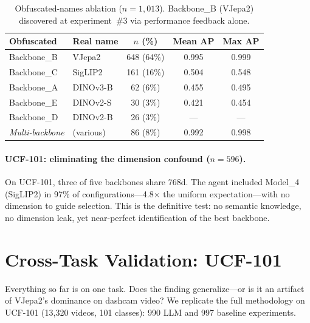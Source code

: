 \documentclass{article}
\begin{document}
\begin{table}[t]
\centering
\caption{Obfuscated-names ablation ($n = 1{,}013$). Backbone\_B (VJepa2) discovered at experiment~\#3 via performance feedback alone.}
\label{tab:obfuscated}
\small
\begin{tabular}{@{}llccc@{}}
\toprule
Obfuscated & Real name & $n$ (\%) & Mean AP & Max AP \\
\midrule
Backbone\_B & VJepa2 & 648 (64\%) & 0.995 & 0.999 \\
Backbone\_C & SigLIP2 & 161 (16\%) & 0.504 & 0.548 \\
Backbone\_A & DINOv3-B & 62 (6\%) & 0.455 & 0.495 \\
Backbone\_E & DINOv2-S & 30 (3\%) & 0.421 & 0.454 \\
Backbone\_D & DINOv2-B & 26 (3\%) & --- & --- \\
\emph{Multi-backbone} & (various) & 86 (8\%) & 0.992 & 0.998 \\
\bottomrule
\end{tabular}
\end{table}

\paragraph{UCF-101: eliminating the dimension confound ($n = 596$).}
On UCF-101, three of five backbones share 768d. The agent included Model\_4 (SigLIP2) in 97\% of configurations---4.8$\times$ the uniform expectation---with no dimension to guide selection. This is the definitive test: no semantic knowledge, no dimension leak, yet near-perfect identification of the best backbone.


\section{Cross-Task Validation: UCF-101}
\label{sec:ucf101}

Everything so far is on one task. Does the finding generalize---or is it an artifact of VJepa2's dominance on dashcam video?
We replicate the full methodology on UCF-101 \citep{soomro2012ucf101} (13{,}320 videos, 101 classes): 990 LLM and 997 baseline experiments.
\end{document}
